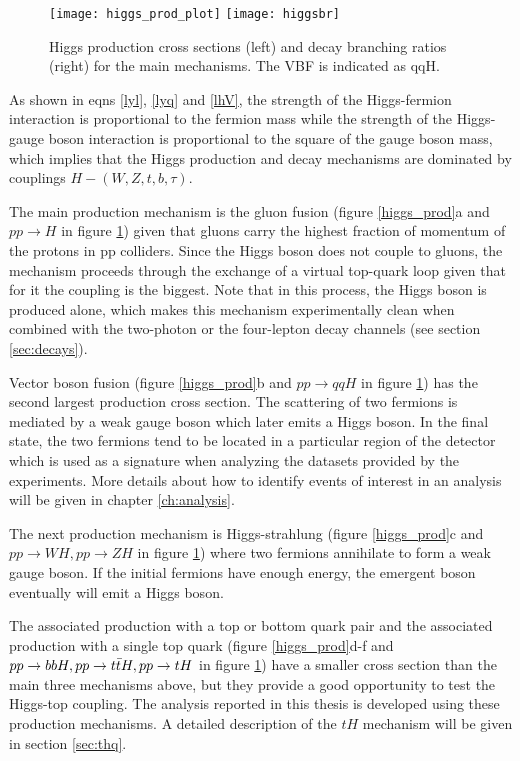 \begin{figure}[!h]
\centering
\texttt{[image: higgs\_prod\_plot]}
\texttt{[image: higgsbr]}
\caption[Higgs production cross section and decay branching ratios]{Higgs production cross sections (left) and decay branching ratios (right) for the main mechanisms. The VBF is indicated as qqH\cite{hcswg}.}
\label{hcs_br}
\end{figure}

\noindent As shown in eqns \ref{lyl}, \ref{lyq} and \ref{lhV}, the strength of the Higgs-fermion interaction is proportional to the fermion mass while the strength of the Higgs-gauge boson interaction is proportional to the square of the gauge boson mass, which implies that the Higgs production and decay mechanisms are dominated by couplings $H-(W,Z,t,b,\tau)$. 

\noindent The main production mechanism is the gluon fusion (figure \ref{higgs_prod}a and $pp\to H$ in figure \ref{hcs_br}) given that gluons carry the highest fraction of momentum of the protons in pp colliders. Since the Higgs boson does not couple to gluons, the mechanism proceeds through the exchange of a virtual top-quark loop given that for it the coupling is the biggest. Note that in this process, the Higgs boson is produced alone, which makes this mechanism experimentally clean when combined with the two-photon or the four-lepton decay channels (see section \ref{sec:decays}).

\noindent Vector boson fusion (figure \ref{higgs_prod}b and $pp\to qqH$ in figure \ref{hcs_br}) has the second largest production cross section. The scattering of two fermions is mediated by a weak gauge boson which later emits a Higgs boson. In the final state, the two fermions tend to be located in a particular region of the detector which is used as a signature when analyzing the datasets provided by the experiments. More details about how to identify events of interest in an analysis will be given in chapter \ref{ch:analysis}. 

\noindent The next production mechanism is Higgs-strahlung (figure \ref{higgs_prod}c and $pp\to WH, pp\to ZH$ in figure \ref{hcs_br}) where two fermions annihilate to form a weak gauge boson. If the initial fermions have enough energy, the emergent boson eventually will emit a Higgs boson.

\noindent The associated production with a top or bottom quark pair and the associated production with a single top quark (figure \ref{higgs_prod}d-f and $pp\to bbH, pp\to t\bar{t}H, pp\to tH$ in figure \ref{hcs_br}) have a smaller cross section than the main three mechanisms above, but they provide a good opportunity to test the Higgs-top coupling. The analysis reported in this thesis is developed using these production mechanisms. A detailed description of the $tH$ mechanism will be given in section \ref{sec:thq}.  


